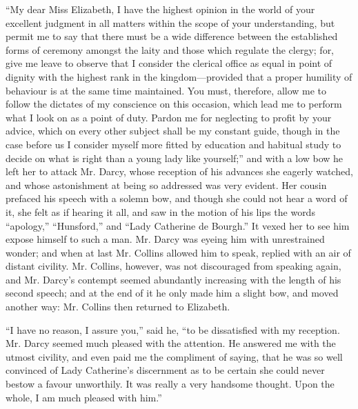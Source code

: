 \documentclass[12pt,openright]{book}
\begin{document}
“My dear Miss Elizabeth, I have the highest opinion in the world of your excellent judgment in all matters within the scope of your understanding, but permit me to say that there must be a wide difference between the established forms of ceremony amongst the laity and those which regulate the clergy; for, give me leave to observe that I consider the clerical office as equal in point of dignity with the highest rank in the kingdom—provided that a proper humility of behaviour is at the same time maintained. You must, therefore, allow me to follow the dictates of my conscience on this occasion, which lead me to perform what I look on as a point of duty. Pardon me for neglecting to profit by your advice, which on every other subject shall be my constant guide, though in the case before us I consider myself more fitted by education and habitual study to decide on what is right than a young lady like yourself;” and with a low bow he left her to attack Mr. Darcy, whose reception of his advances she eagerly watched, and whose astonishment at being so addressed was very evident. Her cousin prefaced his speech with a solemn bow, and though she could not hear a word of it, she felt as if hearing it all, and saw in the motion of his lips the words “apology,” “Hunsford,” and “Lady Catherine de Bourgh.” It vexed her to see him expose himself to such a man. Mr. Darcy was eyeing him with unrestrained wonder; and when at last Mr. Collins allowed him to speak, replied with an air of distant civility. Mr. Collins, however, was not discouraged from speaking again, and Mr. Darcy’s contempt seemed abundantly increasing with the length of his second speech; and at the end of it he only made him a slight bow, and moved another way: Mr. Collins then returned to Elizabeth.

“I have no reason, I assure you,” said he, “to be dissatisfied with my reception. Mr. Darcy seemed much pleased with the attention. He answered me with the utmost civility, and even paid me the compliment of saying, that he was so well convinced of Lady Catherine’s discernment as to be certain she could never bestow a favour unworthily. It was really a very handsome thought. Upon the whole, I am much pleased with him.”
\end{document}
